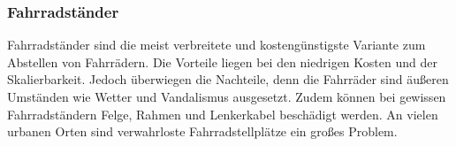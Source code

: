 \subsubsection{Fahrradständer}
Fahrradständer sind die meist verbreitete und kostengünstigste Variante zum Abstellen von Fahrrädern. Die Vorteile liegen bei den niedrigen Kosten und der Skalierbarkeit. Jedoch überwiegen die Nachteile, denn die Fahrräder sind äußeren Umständen wie Wetter und Vandalismus ausgesetzt. Zudem können bei gewissen Fahrradständern Felge, Rahmen und Lenkerkabel beschädigt werden. An vielen urbanen Orten sind verwahrloste Fahrradstellplätze ein großes Problem.